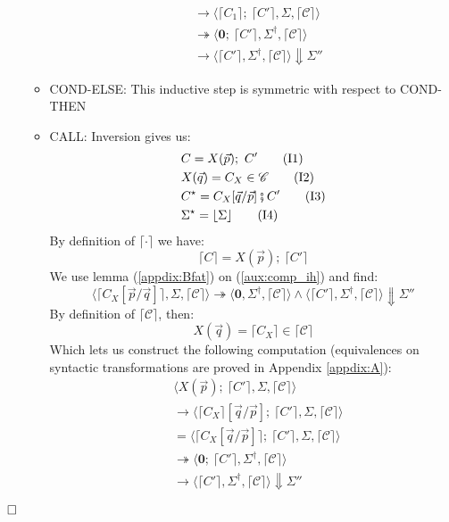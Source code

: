 \documentclass[12pt,a4paper,twoside]{book}
\newcommand{\qed}{\hfill\square}
\begin{document}
\begin{itemize}
\begin{itemize}
\begin{align*}
&\rightarrow \langle \lceil C_1\rceil;~ \lceil C'\rceil, \Sigma, \lceil \mathscr{C}\rceil\rangle\\
&\twoheadrightarrow \langle \boldsymbol{0};~ \lceil C'\rceil, \Sigma^\dag, \lceil \mathscr{C} \rceil \rangle \\
&\rightarrow \langle \lceil C'\rceil, \Sigma^\dag, \lceil \mathscr{C} \rceil \rangle\Downarrow \Sigma''
\end{align*}
\item COND-ELSE: This inductive step is symmetric with respect to COND-THEN
\item CALL: Inversion gives us:
\begin{align}
&C = X(\vec{p});~ C' \label{aux:comp_call1}\tag{I1}\\
&X(\vec{q}) = C_X \in \mathscr{C} \label{aux:comp_call2}\tag{I2}\\
&C^\star = C_X[\vec{q}/\vec{p}] \fatsemi C'\label{aux:comp_then3}\tag{I3}\\
&\Sigma^\star = \lfloor \Sigma \rfloor\label{aux:comp_then4}\tag{I4}
\end{align}
By definition of $\lceil \cdot \rceil$ we have:
$$
\lceil C\rceil = X(\vec{p});~ \lceil C'\rceil
$$
We use lemma (\ref{appdix:Bfat}) on (\ref{aux:comp_ih}) and find:
$$
\langle \lceil C_X[\vec{p}/\vec{q}] \rceil, \Sigma, \lceil \mathscr{C} \rceil \rangle \twoheadrightarrow \langle \boldsymbol{0}, \Sigma^\dag, \lceil \mathscr{C} \rceil \rangle 
\land
\langle \lceil C' \rceil, \Sigma^\dag, \lceil \mathscr{C} \rceil \rangle \Downarrow \Sigma''
$$
By definition of $\lceil \mathscr{C} \rceil$, then:
$$
X(\vec{q}) = \lceil C_X \rceil \in \lceil \mathscr{C} \rceil
$$
Which lets us construct the following computation (equivalences on syntactic transformations are proved in Appendix \ref{appdix:A}):
\begin{align*}
&\langle X(\vec{p});~ \lceil C'\rceil, \Sigma, \lceil \mathscr{C}\rceil\rangle\\
&\rightarrow \langle \lceil C_X\rceil[\vec{q}/\vec{p}];~ \lceil C'\rceil, \Sigma, \lceil \mathscr{C}\rceil\rangle\\
&= \langle \lceil C_X[\vec{q}/\vec{p}]\rceil;~ \lceil C'\rceil, \Sigma, \lceil \mathscr{C}\rceil\rangle\\
&\twoheadrightarrow \langle \boldsymbol{0};~ \lceil C'\rceil, \Sigma^\dag, \lceil \mathscr{C} \rceil \rangle \\
&\rightarrow \langle \lceil C'\rceil, \Sigma^\dag, \lceil \mathscr{C} \rceil \rangle\Downarrow \Sigma''
\end{align*}
\end{itemize}
\end{itemize}
$\qed$
\end{document}
